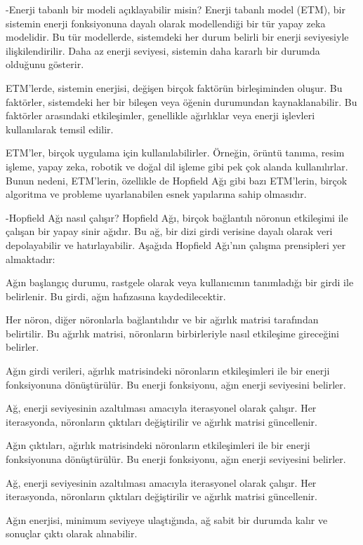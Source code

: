 \documentclass[11pt]{article}
\begin{document}
-Enerji tabanlı bir modeli açıklayabilir misin?
Enerji tabanlı model (ETM), bir sistemin enerji fonksiyonuna dayalı olarak modellendiği bir tür yapay zeka modelidir. Bu tür modellerde, sistemdeki her durum belirli bir enerji seviyesiyle ilişkilendirilir. Daha az enerji seviyesi, sistemin daha kararlı bir durumda olduğunu gösterir.

ETM'lerde, sistemin enerjisi, değişen birçok faktörün birleşiminden oluşur. Bu faktörler, sistemdeki her bir bileşen veya öğenin durumundan kaynaklanabilir. Bu faktörler arasındaki etkileşimler, genellikle ağırlıklar veya enerji işlevleri kullanılarak temsil edilir.

ETM'ler, birçok uygulama için kullanılabilirler. Örneğin, örüntü tanıma, resim işleme, yapay zeka, robotik ve doğal dil işleme gibi pek çok alanda kullanılırlar. Bunun nedeni, ETM'lerin, özellikle de Hopfield Ağı gibi bazı ETM'lerin, birçok algoritma ve probleme uyarlanabilen esnek yapılarına sahip olmasıdır.

-Hopfield Ağı nasıl çalışır?
Hopfield Ağı, birçok bağlantılı nöronun etkileşimi ile çalışan bir yapay sinir ağıdır. Bu ağ, bir dizi girdi verisine dayalı olarak veri depolayabilir ve hatırlayabilir. Aşağıda Hopfield Ağı'nın çalışma prensipleri yer almaktadır:

Ağın başlangıç durumu, rastgele olarak veya kullanıcının tanımladığı bir girdi ile belirlenir. Bu girdi, ağın hafızasına kaydedilecektir.

Her nöron, diğer nöronlarla bağlantılıdır ve bir ağırlık matrisi tarafından belirtilir. Bu ağırlık matrisi, nöronların birbirleriyle nasıl etkileşime gireceğini belirler.

Ağın girdi verileri, ağırlık matrisindeki nöronların etkileşimleri ile bir enerji fonksiyonuna dönüştürülür. Bu enerji fonksiyonu, ağın enerji seviyesini belirler.

Ağ, enerji seviyesinin azaltılması amacıyla iterasyonel olarak çalışır. Her iterasyonda, nöronların çıktıları değiştirilir ve ağırlık matrisi güncellenir.

Ağın çıktıları, ağırlık matrisindeki nöronların etkileşimleri ile bir enerji fonksiyonuna dönüştürülür. Bu enerji fonksiyonu, ağın enerji seviyesini belirler.

Ağ, enerji seviyesinin azaltılması amacıyla iterasyonel olarak çalışır. Her iterasyonda, nöronların çıktıları değiştirilir ve ağırlık matrisi güncellenir.

Ağın enerjisi, minimum seviyeye ulaştığında, ağ sabit bir durumda kalır ve sonuçlar çıktı olarak alınabilir.
\end{document}
